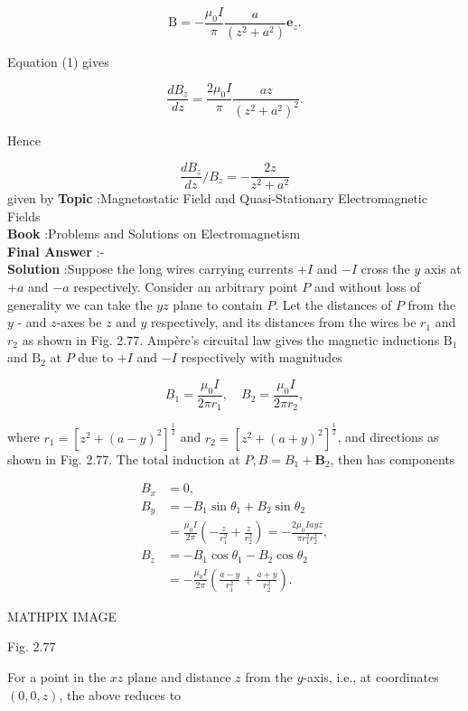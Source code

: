 \documentclass[10pt]{article}
\begin{document}
$$
\mathrm{B}=-\frac{\mu_{0} I}{\pi} \frac{a}{\left(z^{2}+a^{2}\right)} \mathbf{e}_{z} .
$$

 Equation (1) gives

$$
\frac{d B_{z}}{d z}=\frac{2 \mu_{0} I}{\pi} \frac{a z}{\left(z^{2}+a^{2}\right)^{2}} .
$$

Hence

$$
\frac{d B_{z}}{d z} / B_{z}=-\frac{2 z}{z^{2}+a^{2}}
$$
given by
\textbf{Topic} :Magnetostatic Field and Quasi-Stationary Electromagnetic Fields\\
\textbf{Book} :Problems and Solutions on Electromagnetism\\
\textbf{Final Answer} :-\\


\textbf{Solution} :Suppose the long wires carrying currents $+I$ and $-I$ cross the $y$ axis at $+a$ and $-a$ respectively. Consider an arbitrary point $P$ and without loss of generality we can take the $y z$ plane to contain $P$. Let the distances of $P$ from the $y$ - and $z$-axes be $z$ and $y$ respectively, and its distances from the wires be $r_{1}$ and $r_{2}$ as shown in Fig. 2.77. Ampère's circuital law gives the magnetic inductions $\mathrm{B}_{1}$ and $\mathrm{B}_{2}$ at $P$ due to $+I$ and $-I$ respectively with magnitudes

$$
B_{1}=\frac{\mu_{0} I}{2 \pi r_{1}}, \quad B_{2}=\frac{\mu_{0} I}{2 \pi r_{2}},
$$

where $r_{1}=\left[z^{2}+(a-y)^{2}\right]^{\frac{1}{2}}$ and $r_{2}=\left[z^{2}+(a+y)^{2}\right]^{\frac{1}{2}}$, and directions as shown in Fig. 2.77. The total induction at $P, B=B_{1}+\mathbf{B}_{2}$, then has components

$$
\begin{aligned}
B_{x} &=0, \\
B_{y} &=-B_{1} \sin \theta_{1}+B_{2} \sin \theta_{2} \\
&=\frac{\mu_{0} I}{2 \pi}\left(-\frac{z}{r_{1}^{2}}+\frac{z}{r_{2}^{2}}\right)=-\frac{2 \mu_{0} I a y z}{\pi r_{1}^{2} r_{2}^{2}}, \\
B_{z} &=-B_{1} \cos \theta_{1}-B_{2} \cos \theta_{2} \\
&=-\frac{\mu_{0} I}{2 \pi}\left(\frac{a-y}{r_{1}^{2}}+\frac{a+y}{r_{2}^{2}}\right) .
\end{aligned}
$$



MATHPIX IMAGE

Fig. $2.77$

For a point in the $x z$ plane and distance $z$ from the $y$-axis, i.e., at coordinates $(0,0, z)$, the above reduces to
\end{document}
